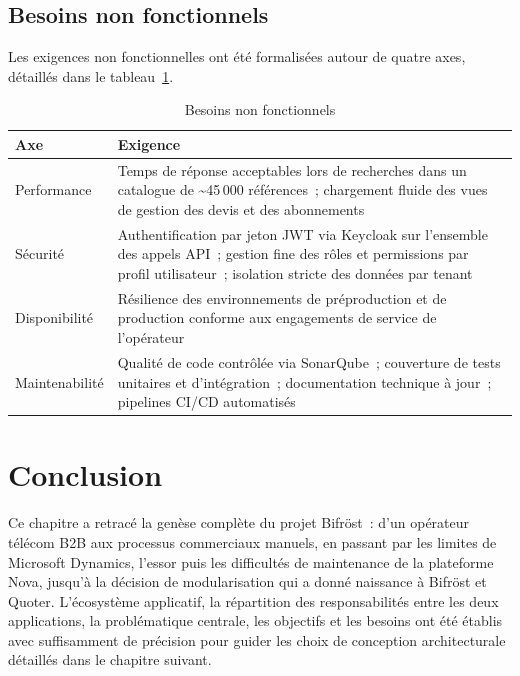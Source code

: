 \subsection{Besoins non fonctionnels}

Les exigences non fonctionnelles ont \'et\'e formalis\'ees autour de quatre axes, d\'etaill\'es dans le tableau~\ref{tab:besoins_nf}.

\begin{table}[H]
\caption{Besoins non fonctionnels}
\label{tab:besoins_nf}
\centering
\renewcommand{\arraystretch}{1.55}
\begin{tabular}{|>{\raggedright\arraybackslash}p{3cm}|>{\raggedright\arraybackslash}p{10cm}|}
\hline
\rowcolor{gray!15}
\textbf{Axe} & \textbf{Exigence} \\
\hline
Performance & Temps de r\'eponse acceptables lors de recherches dans un catalogue de \textasciitilde{}45\,000 r\'ef\'erences~; chargement fluide des vues de gestion des devis et des abonnements \\
\hline
S\'ecurit\'e & Authentification par jeton JWT via Keycloak sur l'ensemble des appels API~; gestion fine des r\^oles et permissions par profil utilisateur~; isolation stricte des donn\'ees par tenant \\
\hline
Disponibilit\'e & R\'esilience des environnements de pr\'eproduction et de production conforme aux engagements de service de l'op\'erateur \\
\hline
Maintenabilit\'e & Qualit\'e de code contr\^ol\'ee via SonarQube~; couverture de tests unitaires et d'int\'egration~; documentation technique \`a jour~; pipelines CI/CD automatis\'es \\
\hline
\end{tabular}
\end{table}

\section{Conclusion}

Ce chapitre a retrac\'e la gen\`ese compl\`ete du projet Bifr\"ost~: d'un op\'erateur t\'el\'ecom B2B aux processus commerciaux manuels, en passant par les limites de Microsoft Dynamics, l'essor puis les difficult\'es de maintenance de la plateforme Nova, jusqu'\`a la d\'ecision de modularisation qui a donn\'e naissance \`a Bifr\"ost et Quoter. L'\'ecosyst\`eme applicatif, la r\'epartition des responsabilit\'es entre les deux applications, la probl\'ematique centrale, les objectifs et les besoins ont \'et\'e \'etablis avec suffisamment de pr\'ecision pour guider les choix de conception architecturale d\'etaill\'es dans le chapitre suivant.